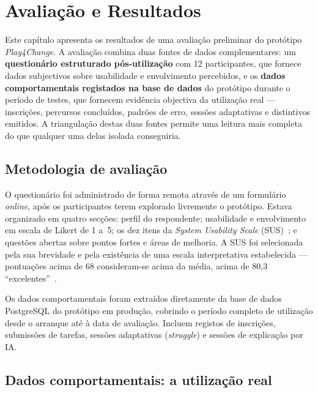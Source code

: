 %
%
\chapter{Avaliação e Resultados}
\label{cha:avaliacao}

Este capítulo apresenta os resultados de uma avaliação preliminar do protótipo \emph{Play4Change}. A avaliação combina duas fontes de dados complementares: um \textbf{questionário estruturado pós-utilização} com 12 participantes, que fornece dados subjectivos sobre usabilidade e envolvimento percebidos, e os \textbf{dados comportamentais registados na base de dados} do protótipo durante o período de testes, que fornecem evidência objectiva da utilização real --- inscrições, percursos concluídos, padrões de erro, sessões adaptativas e distintivos emitidos. A triangulação destas duas fontes permite uma leitura mais completa do que qualquer uma delas isolada conseguiria.

\section{Metodologia de avaliação}
\label{sec:metodologia-avaliacao}

O questionário foi administrado de forma remota através de um formulário \emph{online}, após os participantes terem explorado livremente o protótipo. Estava organizado em quatro secções: perfil do respondente; usabilidade e envolvimento em escala de Likert de 1 a~5; os dez itens da \emph{System Usability Scale} (SUS)~\cite{brooke1996sus}; e questões abertas sobre pontos fortes e áreas de melhoria. A SUS foi selecionada pela sua brevidade e pela existência de uma escala interpretativa estabelecida --- pontuações acima de 68 consideram-se acima da média, acima de 80,3 ``excelentes''~\cite{brooke1996sus}.

Os dados comportamentais foram extraídos diretamente da base de dados PostgreSQL do protótipo em produção, cobrindo o período completo de utilização desde o arranque até à data de avaliação. Incluem registos de inscrições, submissões de tarefas, sessões adaptativas (\emph{struggle}) e sessões de explicação por IA.

\section{Dados comportamentais: a utilização real}
\label{sec:dados-comportamentais}

